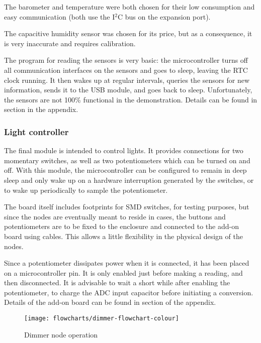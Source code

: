 The barometer and temperature were both chosen for their low consumption and
easy communication (both use the I$^{2}$C bus on the expansion port).

The capacitive humidity sensor was chosen for its price, but as a consequence,
it is very inaccurate and requires calibration.

The program for reading the sensors is very basic: the microcontroller turns off
all communication interfaces on the sensors and goes to sleep, leaving the RTC
clock running. It then wakes up at regular intervals, queries the sensors for
new information, sends it to the USB module, and goes back to sleep.
Unfortunately, the sensors are not 100\% functional in the demonstration.
Details can be found in section  in the appendix.

\subsubsection{Light controller}

The final module is intended to control lights. It provides connections for two
momentary switches, as well as two potentiometers which can be turned on and
off. With this module, the microcontroller can be configured to remain in deep
sleep and only wake up on a hardware interruption generated by the switches, or
to wake up periodically to sample the potentiometer.

The board itself includes footprints for SMD switches, for testing purposes, but
since the nodes are eventually meant to reside in cases, the buttons and
potentiometers are to be fixed to the enclosure and connected to the add-on
board using cables. This allows a little flexibility in the physical design of
the nodes.

Since a potentiometer dissipates power when it is connected, it has been placed
on a microcontroller pin. It is only enabled just before making a reading, and
then disconnected. It is advisable to wait a short while after enabling the
potentiometer, to charge the ADC input capacitor before initiating a conversion.
Details of the add-on board can be found in section  of
the appendix.

\begin{figure}[!h]
  \begin{center}
    \texttt{[image: flowcharts/dimmer-flowchart-colour]}
  \end{center}
  \caption{Dimmer node operation}
  \label{fig:dimmer-flowchart}
\end{figure}

